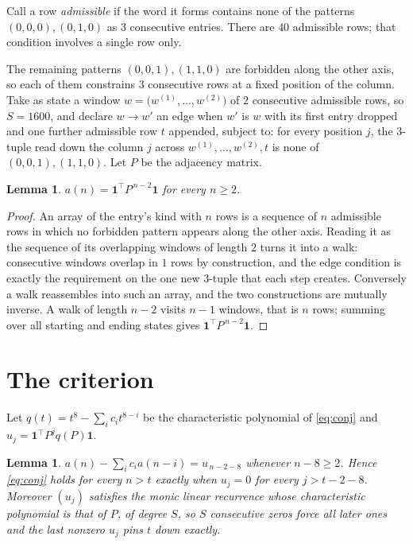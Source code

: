 \documentclass[11pt,a4paper]{article}
\theoremstyle{plain}
\newtheorem{lemma}[theorem]{Lemma}
\theoremstyle{definition}
\begin{document}
Call a row \emph{admissible} if the word it forms contains none of the patterns
$(0,0,0), (0,1,0)$ as $3$ consecutive entries. There are $40$ admissible rows; that condition
involves a single row only.

The remaining patterns $(0,0,1), (1,1,0)$ are forbidden along the other axis, so each of them
constrains $3$ consecutive rows at a fixed position of the column. Take as state a
window $w=\bigl(w^{(1)},\dots,w^{(2)}\bigr)$ of $2$ consecutive admissible
rows, so $S=1600$, and declare $w\to w'$ an edge when $w'$ is $w$ with its first entry
dropped and one further admissible row $t$ appended, subject to: for every position
$j$, the $3$-tuple read down the column $j$ across $w^{(1)},\dots,w^{(2)},t$
is none of $(0,0,1), (1,1,0)$. Let $P$ be the adjacency matrix.

\begin{lemma}\label{lem:walk}
$a(n)=\mathbf{1}^{\!\top}P^{\,n-2}\mathbf{1}$ for every $n\ge2$.
\end{lemma}

\begin{proof}
An array of the entry's kind with $n$ rows is a sequence of $n$ admissible rows in
which no forbidden pattern appears along the other axis. Reading it as the sequence of its
overlapping windows of length $2$ turns it into a walk: consecutive windows overlap in
$1$ rows by construction, and the edge condition is exactly the requirement on the one
new $3$-tuple that each step creates. Conversely a walk reassembles into such an array,
and the two constructions are mutually inverse. A walk of length $n-2$ visits $n-1$
windows, that is $n$ rows; summing over all starting and ending states gives
$\mathbf{1}^{\!\top}P^{\,n-2}\mathbf{1}$.
\end{proof}

\section{The criterion}

Let $q(t)=t^{8}-\sum_i c_i t^{8-i}$ be the characteristic polynomial of
\eqref{eq:conj} and $u_j=\mathbf{1}^{\!\top}P^{j}q(P)\mathbf{1}$.

\begin{lemma}\label{lem:crit}
$a(n)-\sum_i c_i a(n-i)=u_{\,n-2-8}$ whenever $n-8\ge2$. Hence
\eqref{eq:conj} holds for every $n>t$ exactly when $u_j=0$ for every
$j>t-2-8$. Moreover $(u_j)$ satisfies the monic linear recurrence whose
characteristic polynomial is that of $P$, of degree $S$, so $S$ consecutive zeros force all
later ones and the last nonzero $u_j$ pins $t$ down exactly.
\end{lemma}
\end{document}
